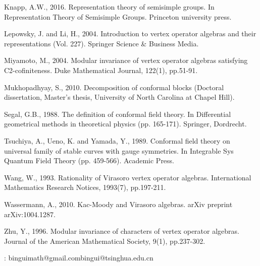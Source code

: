 \documentclass[12pt,a4paper,notitlepage]{article}
\theoremstyle{definition}
\theoremstyle{plain}
\numberwithin{equation}{section}
\begin{document}
\begin{thebibliography}{999999}
Knapp, A.W., 2016. Representation theory of semisimple groups. In Representation Theory of Semisimple Groups. Princeton university press.



Lepowsky, J. and Li, H., 2004. Introduction to vertex operator algebras and their representations (Vol. 227). Springer Science \& Business Media.

Miyamoto, M., 2004. Modular invariance of vertex operator algebras satisfying C2-cofiniteness. Duke Mathematical Journal, 122(1), pp.51-91.


Mukhopadhyay, S., 2010. Decomposition of conformal blocks (Doctoral dissertation, Master’s thesis, University of North Carolina at Chapel Hill).

Segal, G.B., 1988. The definition of conformal field theory. In Differential geometrical methods in theoretical physics (pp. 165-171). Springer, Dordrecht.

Tsuchiya, A., Ueno, K. and Yamada, Y., 1989. Conformal field theory on universal family of stable curves with gauge symmetries. In Integrable Sys Quantum Field Theory (pp. 459-566). Academic Press.





Wang, W., 1993. Rationality of Virasoro vertex operator algebras. International Mathematics Research Notices, 1993(7), pp.197-211.



Wassermann, A., 2010. Kac-Moody and Virasoro algebras. arXiv preprint arXiv:1004.1287.

Zhu, Y., 1996. Modular invariance of characters of vertex operator algebras. Journal of the American Mathematical Society, 9(1), pp.237-302.




		
		
\end{thebibliography}


: binguimath@gmail.com\qquad bingui@tsinghua.edu.cn
\end{document}
